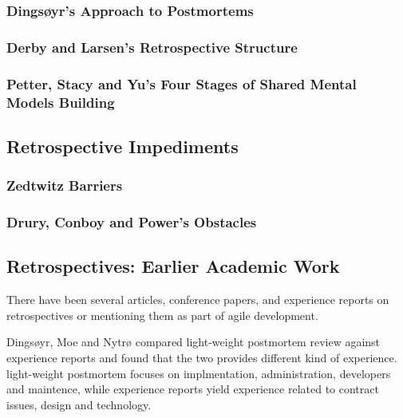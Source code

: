 \subsubsection{Dingsøyr's Approach to Postmortems}

\subsubsection{Derby and Larsen's Retrospective Structure}

\subsubsection{Petter, Stacy and Yu's Four Stages of Shared Mental Models Building}

\subsection{Retrospective Impediments}
\subsubsection{Zedtwitz Barriers}
\subsubsection{Drury, Conboy and Power's Obstacles}

\subsection{Retrospectives: Earlier Academic Work}
There have been several articles, conference papers, and experience reports on retrospectives or mentioning them as part of agile development.

Dingsøyr, Moe and Nytrø compared light-weight postmortem review against experience reports and found that the two provides different kind of experience. light-weight postmortem focuses on implmentation, administration, developers and maintence, while experience reports yield experience related to contract issues, design and technology. 

